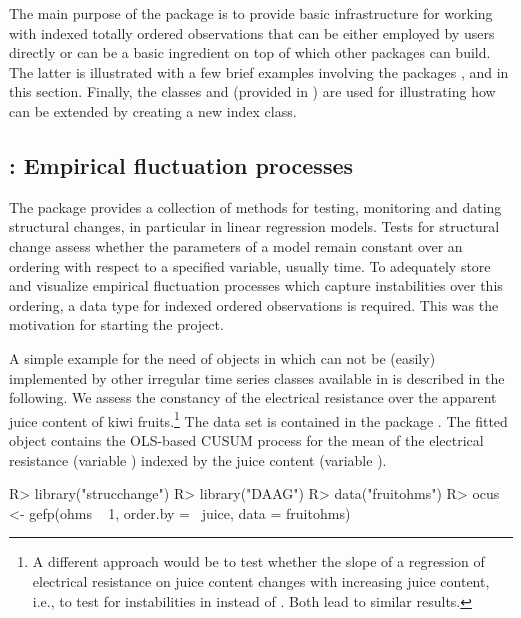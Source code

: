 \documentclass{Z}
\begin{document}
The main purpose of the package  is to provide basic infrastructure for
working with indexed totally ordered observations that can be either employed by
users directly or can be a basic ingredient on top of which other packages can
build. The latter is illustrated with a few brief examples involving the packages
,  and  in this section. Finally, the 
classes  and  (provided in )
are used for illustrating how  can be extended by creating a new index class.

\subsection[strucchange: Empirical fluctuation processes]{: Empirical fluctuation processes}
\label{sec:strucchange}

The package  provides a collection of methods for testing,
monitoring and dating structural changes, in particular in linear regression models.
Tests for structural change assess whether the parameters of a model remain
constant over an ordering with respect to a specified variable, usually time.
To adequately store and visualize empirical fluctuation processes which 
capture instabilities over this ordering, a data type for indexed ordered
observations is required. This was the motivation for starting the 
project.

A simple example for the need of  objects in 
which can not be (easily) implemented by other irregular time series classes
available in  is described in the following. We assess the constancy of the
electrical resistance over the apparent juice content of kiwi fruits.\footnote{A different
approach would be to test whether the slope of a regression of electrical resistance
on juice content changes with increasing juice content, i.e., to test for
instabilities in  instead of . Both lead to 
similar results.} The data
set  is contained in the  package \citep{zoo:DAAG:2004}.
The fitted  object contains the OLS-based CUSUM process for the mean
of the electrical resistance (variable ) indexed by the juice
content (variable ).

\begin{Schunk}
\begin{Sinput}
R> library("strucchange")
R> library("DAAG")
R> data("fruitohms")
R> ocus <- gefp(ohms ~ 1, order.by = ~juice, data = fruitohms)
\end{Sinput}
\end{Schunk}
\end{document}

